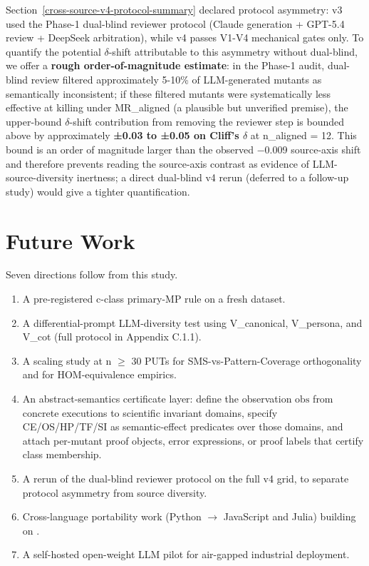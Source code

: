 \documentclass[review,12pt,authoryear]{elsarticle}
\begin{document}
Section~\ref{cross-source-v4-protocol-summary} declared protocol asymmetry: v3 used the Phase-1 dual-blind
reviewer protocol (Claude generation + GPT-5.4 review + DeepSeek
arbitration), while v4 passes V1-V4 mechanical gates only. To quantify
the potential $\delta$-shift attributable to this asymmetry without dual-blind,
we offer a \textbf{rough order-of-magnitude estimate}: in the Phase-1
audit, dual-blind review filtered approximately 5-10\% of LLM-generated
mutants as semantically inconsistent; if these filtered mutants were
systematically less effective at killing under MR\_aligned (a plausible
but unverified premise), the upper-bound $\delta$-shift contribution from
removing the reviewer step is bounded above by approximately
\textbf{±0.03 to ±0.05 on Cliff's $\delta$} at n\_aligned = 12. This bound is
an order of magnitude larger than the observed −0.009 source-axis shift
and therefore prevents reading the source-axis contrast as evidence of
LLM-source-diversity inertness; a direct dual-blind v4 rerun (deferred
to a follow-up study) would give a tighter quantification.


\section{Future Work}\label{future-work-and-p-series-roadmap}

Seven directions follow from this study.

\begin{enumerate}
\item
  A pre-registered c-class primary-MP rule on a fresh dataset.
\item
  A differential-prompt LLM-diversity test using V\_canonical,
  V\_persona, and V\_cot (full protocol in Appendix C.1.1).
\item
  A scaling study at n $\geq$ 30 PUTs for SMS-vs-Pattern-Coverage
  orthogonality and for HOM-equivalence empirics.
\item
  An abstract-semantics certificate layer: define the observation
  $\mathrm{obs}$ from concrete executions to scientific invariant domains,
  specify CE/OS/HP/TF/SI as semantic-effect predicates over those
  domains, and attach per-mutant proof objects, error expressions, or
  proof labels that certify class membership.
\item
  A rerun of the dual-blind reviewer protocol on the full v4 grid, to
  separate protocol asymmetry from source diversity.
\item
  Cross-language portability work (Python $\to$ JavaScript and Julia)
  building on \citet{tip2025llmorpheus}.
\item
  A self-hosted open-weight LLM pilot for air-gapped industrial
  deployment.
\end{enumerate}
\end{document}
